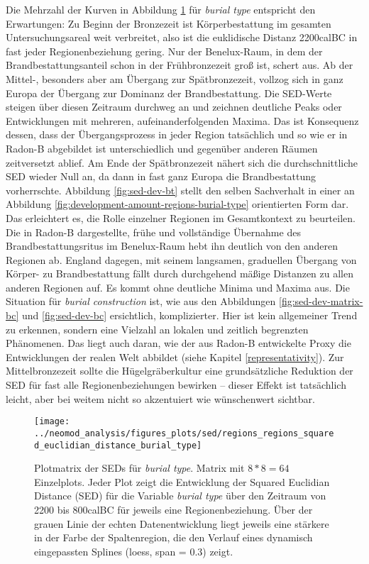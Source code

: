 \documentclass[openany,twoside,twocolumn]{book}
\begin{document}
Die Mehrzahl der Kurven in Abbildung \ref{fig:sed-dev-matrix-bt} für
\emph{burial type} entspricht den Erwartungen: Zu Beginn der Bronzezeit
ist Körperbestattung im gesamten Untersuchungsareal weit verbreitet,
also ist die euklidische Distanz 2200calBC in fast jeder
Regionenbeziehung gering. Nur der Benelux-Raum, in dem der
Brandbestattungsanteil schon in der Frühbronzezeit groß ist, schert aus.
Ab der Mittel-, besonders aber am Übergang zur Spätbronzezeit, vollzog
sich in ganz Europa der Übergang zur Dominanz der Brandbestattung. Die
SED-Werte steigen über diesen Zeitraum durchweg an und zeichnen
deutliche Peaks oder Entwicklungen mit mehreren, aufeinanderfolgenden
Maxima. Das ist Konsequenz dessen, dass der Übergangsprozess in jeder
Region tatsächlich und so wie er in Radon-B abgebildet ist
unterschiedlich und gegenüber anderen Räumen zeitversetzt ablief. Am
Ende der Spätbronzezeit nähert sich die durchschnittliche SED wieder
Null an, da dann in fast ganz Europa die Brandbestattung vorherrschte.
Abbildung \ref{fig:sed-dev-bt} stellt den selben Sachverhalt in einer an
Abbildung \ref{fig:development-amount-regions-burial-type} orientierten
Form dar. Das erleichtert es, die Rolle einzelner Regionen im
Gesamtkontext zu beurteilen. Die in Radon-B dargestellte, frühe und
vollständige Übernahme des Brandbestattungsritus im Benelux-Raum hebt
ihn deutlich von den anderen Regionen ab. England dagegen, mit seinem
langsamen, graduellen Übergang von Körper- zu Brandbestattung fällt
durch durchgehend mäßige Distanzen zu allen anderen Regionen auf. Es
kommt ohne deutliche Minima und Maxima aus. Die Situation für
\emph{burial construction} ist, wie aus den Abbildungen
\ref{fig:sed-dev-matrix-bc} und \ref{fig:sed-dev-bc} ersichtlich,
komplizierter. Hier ist kein allgemeiner Trend zu erkennen, sondern eine
Vielzahl an lokalen und zeitlich begrenzten Phänomenen. Das liegt auch
daran, wie der aus Radon-B entwickelte Proxy die Entwicklungen der
realen Welt abbildet (siehe Kapitel \ref{representativity}). Zur
Mittelbronzezeit sollte die Hügelgräberkultur eine grundsätzliche
Reduktion der SED für fast alle Regionenbeziehungen bewirken -- dieser
Effekt ist tatsächlich leicht, aber bei weitem nicht so akzentuiert wie
wünschenwert sichtbar.

\begin{figure}
\texttt{[image: ../neomod\_analysis/figures\_plots/sed/regions\_regions\_squared\_euclidian\_distance\_burial\_type]} \caption[Plotmatrix der SEDs für \textit{burial type}]{Plotmatrix der SEDs für \textit{burial type}. Matrix mit $8*8=64$ Einzelplots. Jeder Plot zeigt die Entwicklung der Squared Euclidian Distance (SED) für die Variable \textit{burial type} über den Zeitraum von 2200 bis 800calBC für jeweils eine Regionenbeziehung. Über der grauen Linie der echten Datenentwicklung liegt jeweils eine stärkere in der Farbe der Spaltenregion, die den Verlauf eines dynamisch eingepassten Splines (loess, span = 0.3) zeigt.}\label{fig:sed-dev-matrix-bt}
\end{figure}
\end{document}
